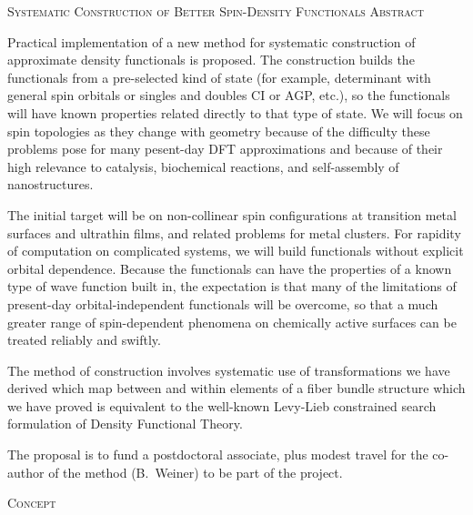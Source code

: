 \documentclass[nofootinbib,floatfix,aps,pra,preprint]{revtex4}
\begin{document}
\renewcommand{\labelenumi}{\Alph{enumi}.}

\setcounter{page}{1} \renewcommand{\baselinestretch}{1.1}

\textrm{\vspace*{-01.1cm} \noindent }

\begin{center}
\textrm{{\large \textsc{Systematic Construction of Better Spin-Density
Functionals}} \textsc{Abstract} }
\end{center}

\textrm{Practical implementation of a new method for systematic construction
of approximate density functionals is proposed. The construction builds the
functionals from a pre-selected kind of state (for example, determinant with
general spin orbitals or singles and doubles CI or AGP, etc.), so the
functionals will have known properties related directly to that type of
state. We will focus on spin topologies as they change with geometry because
of the difficulty these problems pose for many pesent-day DFT approximations
and because of their high relevance to catalysis, biochemical reactions, and
self-assembly of nanostructures. }

\textrm{The initial target will be on non-collinear spin configurations at
transition metal surfaces and ultrathin films, and related problems for
metal clusters. For rapidity of computation on complicated systems, we will
build functionals without explicit orbital dependence. Because the
functionals can have the properties of a known type of wave function built
in, the expectation is that many of the limitations of present-day
orbital-independent functionals will be overcome, so that a much greater
range of spin-dependent phenomena on chemically active surfaces can be
treated reliably and swiftly. }

\textrm{The method of construction involves systematic use of
transformations we have derived which map between and within elements of a
fiber bundle structure which we have proved is equivalent to the well-known
Levy-Lieb constrained search formulation of Density Functional Theory. }

\textrm{The proposal is to fund a postdoctoral associate, plus modest travel
for the co-author of the method (B.~Weiner) to be part of the project.
\newpage \noindent }

\begin{center}
\textrm{\textsc{Concept} }
\end{center}
\end{document}
